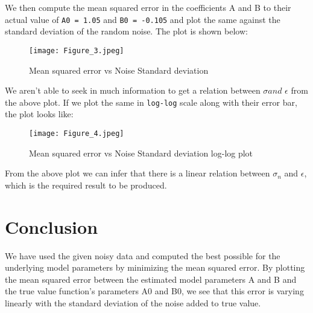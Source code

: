\documentclass[11pt, a4paper]{article}
\begin{document}
We then compute the mean squared error in the coefficients A and B to their actual value of \texttt{A0 = 1.05} and \texttt{B0 = -0.105} and plot the same  against the standard deviation of the random noise. The plot is shown below:

\begin{figure}[!tbh]
   	\centering
   	\texttt{[image: Figure\_3.jpeg]} 
   	\caption{Mean squared error vs Noise Standard deviation}
   	\label{fig:fig4}
   \end{figure} 

We aren't able to seek in much information to get a relation between $\sigma and$ $\epsilon$ from the above plot. If we plot the same in \texttt{log-log} scale along with their error bar, the plot looks like:

\begin{figure}[!tbh]
   	\centering
   	\texttt{[image: Figure\_4.jpeg]} 
   	\caption{Mean squared error vs Noise Standard deviation log-log plot}
   	\label{fig:fig5}
   \end{figure} 
 
 From the above plot we can infer that there is a linear relation between $\sigma_n$ and $\epsilon$, which is the required result to be produced.

\section{Conclusion}
We have used the given noisy data and computed the best possible for the underlying model parameters by minimizing the mean squared error. By plotting the mean squared error between the estimated model parameters A and B and the true value function's parameters A0 and B0, we see that this error is varying linearly with the standard deviation of the noise added to true value.
\end{document}
